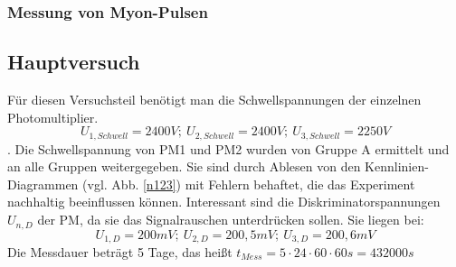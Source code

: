         \subsubsection{Messung von Myon-Pulsen}
    \subsection{Hauptversuch}
        Für diesen Versuchsteil benötigt man die Schwellspannungen der einzelnen Photomultiplier. $$ U_{1,Schwell} = 2400\unit{V};\ U_{2,Schwell} = 2400\unit{V};\ U_{3,Schwell} = 2250\unit{V} $$. Die Schwellspannung von PM1 und PM2 wurden von Gruppe A ermittelt und an alle Gruppen weitergegeben. Sie sind durch Ablesen von den Kennlinien-Diagrammen (vgl. Abb. \ref{n123}) mit Fehlern behaftet, die das Experiment nachhaltig beeinflussen können.
        Interessant sind die Diskriminatorspannungen $U_{n,D}$ der PM, da sie das Signalrauschen unterdrücken sollen. Sie liegen bei: $$ U_{1,D} = 200\unit{mV};\ U_{2,D} = 200,5\unit{mV};\ U_{3,D} = 200,6\unit{mV} $$
        Die Messdauer beträgt 5 Tage, das heißt $t_{Mess} = 5\cdot24\cdot60\cdot60\unit{s} = 432000\unit{s}$